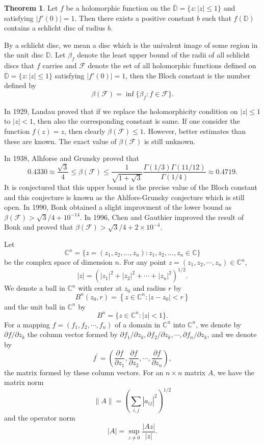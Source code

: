 \documentclass[a4paper,12pt,reqno]{amsart}
\theoremstyle{plain}
\theoremstyle{definition}
\newcounter {own}
\newtheorem{Thm}{Theorem}
\numberwithin{equation}{section}
\begin{document}
\begin{Thm}\cite{Bloch-1925}
Let $f$ be a holomorphic function on the $\overline{\mathbb{D}}=\{z:|z|\leq 1\}$ and satisfying $|f'(0)|=1$. Then there exists a positive constant $b$ such that $f(\mathbb{D})$ contains a schlicht disc of radius $b$.
\end{Thm}

 By a schlicht disc, we mean a disc which is the univalent image of some region in the unit disc $\mathbb{D}$. Let $\beta_f$ denote the least upper bound of the radii of all schlicht discs that $f$ carries and $\mathcal{F}$ denote the set of all holomorphic functions defined on $\overline{\mathbb{D}}=\{z:|z|\leq 1\} $ satisfying $|f'(0)|=1$, then the Bloch constant is the number defined by $$\beta(\mathcal{F})=\inf\{{\beta_f: f \in \mathcal{F}}\}.$$

In 1929, Landau \cite{Landau1} proved that if we replace the holomorphicity condition on $|z|\leq 1$ to $|z|< 1$, then also the corresponding constant is same. If one consider the function $f(z)=z$, then clearly $\beta(\mathcal{F})\leq1$. However, better estimates than these are known. The exact value of $\beta(\mathcal{F})$ is still unknown. 

In 1938, Alhforse and Grunsky \cite{Ahlfors-Grunsky-1937} proved that 
$$
0.4330 \approx \frac{\sqrt{3}}{4} \leq \beta(\mathcal{F}) \leq \frac{1}{\sqrt{1+\sqrt{3}}}\frac{\Gamma(1/3)\Gamma(11/12)}{\Gamma(1/4)}\approx 0.4719.
$$
 It is conjectured that this upper bound is the precise value of the Bloch constant and this conjecture is known as the Ahlfors-Grunsky conjecture which is still open. In 1990, Bonk \cite{Bonk-1990} obtained a slight improvment of the lower bound as $\beta(\mathcal{F})>\sqrt{3}/4+10^{-14}$. In 1996, Chen and Gauthier \cite{Bconstant} improved the result of Bonk and  proved that $ \beta(\mathcal{F})> \sqrt{3}/4+2\times10^{-4}$.
\vspace{2mm}

Let $$\mathbb{C}^n=\{z=(z_1,z_2,...,z_n):z_1,z_2,...,z_n\in\mathbb{C}\}$$
be the complex space of dimension $n$. For any point $z=\left(z_1, z_2, \cdots, z_n\right) \in \mathbb{C}^n$, 
$$
|z|=\left(\left|z_1\right|^2+\left|z_2\right|^2+\cdots+\left|z_n\right|^2\right)^{1 / 2}.
$$
We denote a ball in $\mathbb{C}^n$ with center at $z_0$ and radius $r$ by
$$
B^n\left(z_0, r\right)=\left\{z \in \mathbb{C}^n:\left|z-z_0\right|<r\right\}
$$
and the unit ball in $\mathbb{C}^n$ by
$$
B^n=\{z \in \mathbb{C}^n:|z|<1\}.
$$
For a mapping $f=\left(f_1, f_2, \cdots, f_n\right)$ of a domain in $\mathbb{C}^n$ into $\mathbb{C}^n$, we denote by $\partial f / \partial z_k$ the column vector formed by $\partial f_1 / \partial z_k, \partial f_2 / \partial z_k, \cdots, \partial f_n / \partial z_k$, and we denote by
$$
f^{\prime}=\left(\frac{\partial f}{\partial z_1}, \frac{\partial f}{\partial z_2}, \cdots, \frac{\partial f}{\partial z_n}\right),
$$
the matrix formed by these column vectors.
For an $n\times n$ matrix $A$, we have the matrix norm
$$
\|A\|=\left(\sum_{i, j}\left|a_{i j}\right|^2\right)^{1 / 2}
$$
and the operator norm 
$$|A|=\sup_{z\neq 0}\frac{|Az|}{|z|}.$$
\end{document}
